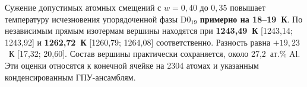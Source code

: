 Сужение допустимых атомных смещений с \(w=0{,}40\) до \(0{,}35\) повышает температуру исчезновения упорядоченной фазы D0$_{19}$ \textbf{примерно на 18--19~К}. По независимым прямым изотермам вершины находятся при \textbf{1243,49~К} [1243,14; 1243,92] и \textbf{1262,72~К} [1260,79; 1264,08] соответственно. Разность равна \(+19{,}23\)~К [17,32; 20,60]. Состав вершины практически сохраняется, около 27,2~ат.\% Al. Эти оценки относятся к конечной ячейке на 2304 атомах и указанным конденсированным ГПУ-ансамблям.
